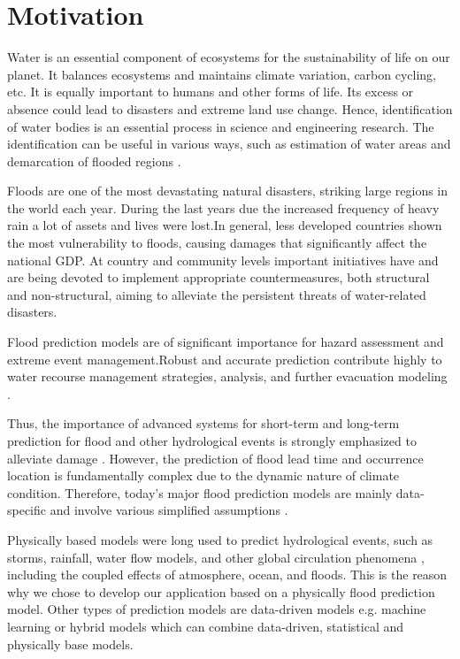 \documentclass[12pt, a4paper]{report}
\begin{document}
\section{Motivation}
\quad
Water is an essential component of ecosystems for the sustainability of life on our planet. It balances ecosystems and maintains climate variation, carbon cycling, etc. It is equally important to humans and other forms of life. Its excess or absence could lead to disasters and extreme land use change. Hence, identification of water bodies is an essential process in science and engineering research. The identification can be useful in various ways, such as estimation of water areas and demarcation of flooded regions \cite {Rover, Alsdorf}.
\par 

Floods are one of the most devastating natural disasters, striking large regions in the world each year. During the last years due the increased frequency of heavy rain a lot of assets and lives were lost.In general, less developed countries shown the most vulnerability to floods, causing damages that significantly affect the national GDP. At country and community levels important initiatives have and are being devoted to implement appropriate countermeasures, both structural and non-structural, aiming to alleviate the persistent threats of water-related disasters. \cite{Flood-forecasting} 
\par

Flood prediction models are of significant importance for hazard assessment and extreme event management.Robust and accurate prediction contribute highly to water recourse management strategies, analysis, and further evacuation modeling \cite{Xie}.
\par

Thus, the importance of advanced systems for short-term and long-term prediction for flood and other hydrological events is strongly emphasized to alleviate damage \cite{Pitt}. However, the prediction of flood lead time and occurrence location is fundamentally complex due to the dynamic nature of climate condition. Therefore, today’s major flood prediction models are mainly data-specific and involve various simplified assumptions \cite{Lohani}. 
\par

Physically based models were long used to predict hydrological events, such as storms, rainfall, water flow models, and other global circulation phenomena , including the coupled effects of atmosphere, ocean, and floods. This is the reason why we chose to develop our application based on a physically flood prediction model. Other types of prediction models are data-driven models e.g. machine learning or hybrid models which can combine data-driven, statistical and physically base models.
\par 
\end{document}
